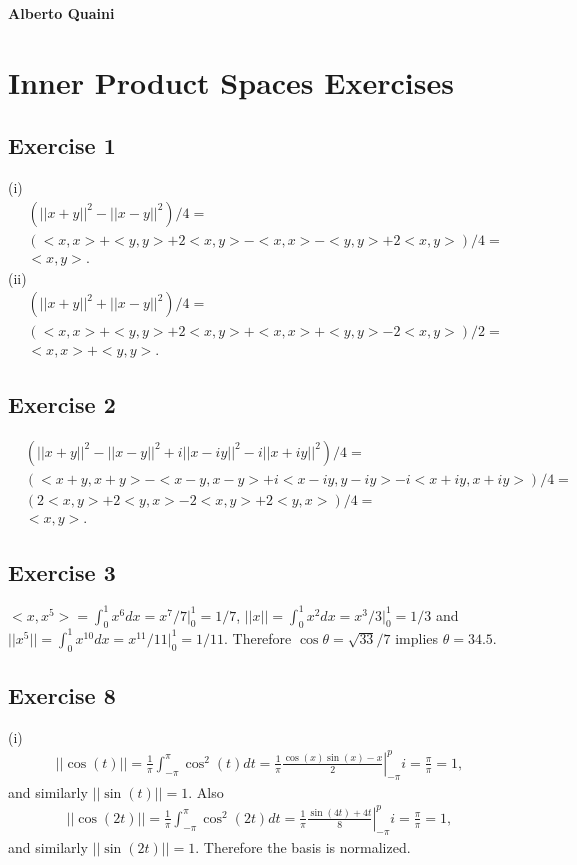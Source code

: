 \documentclass[11.5pt, letterpaper, bibtotoc,
    tablecaptionabove, figurecaptionabove]{article}
\begin{document}
\textbf{Alberto Quaini}

\section*{Inner Product Spaces Exercises}

\subsection*{Exercise 1}
(i)
\begin{align*}
    &\left( ||x+y||^2 - ||x-y||^2 \right)/4=\\
    &\left( <x,x> + <y,y> + 2<x,y> - <x,x> - <y,y> + 2<x,y>\right)/4=\\
    &<x,y>.
\end{align*}
(ii)
\begin{align*}
    &\left( ||x+y||^2 + ||x-y||^2 \right) / 4 =\\
    &\left( <x,x> + <y,y> + 2<x,y> + <x,x> + <y,y> - 2<x,y>\right) / 2 =\\
    &<x,x> + <y,y>.
\end{align*}

\subsection*{Exercise 2}
\begin{align*}
    &(||x+y||^2 - ||x-y||^2 + i||x-iy||^2 - i||x+iy||^2) / 4 =\\
    &(<x+y,x+y> - <x-y,x-y> + i<x-iy,y-iy> - i<x+iy,x+iy>) / 4 =\\ 
    &(2<x,y> + 2<y,x> -2<x,y> +2<y,x>) / 4=\\
    &<x,y>.
\end{align*}

\subsection*{Exercise 3}
$<x,x^5> = \int_0^1x^6dx=x^7/7|_0^1=1/7$,
$||x|| = \int_0^1x^2dx=x^3/3|_0^1=1/3$ and
$||x^5|| = \int_0^1x^10dx=x^11/11|_0^1=1/11$.
Therefore $\cos\theta=\sqrt{33}/7$ implies $\theta=34.5$.

\subsection*{Exercise 8}
(i)
\begin{align*}
    ||\cos(t)||=\frac{1}{\pi}\int_{-\pi}^\pi\cos^2(t)dt=
    \frac{1}{\pi}\left.\frac{\cos(x)\sin(x)-x}{2}\right\lvert_{-\pi}^pi=\frac{\pi}{\pi}=1,
\end{align*}
and similarly $||\sin(t)||=1$.
Also
\begin{align*}
    ||\cos(2t)||=\frac{1}{\pi}\int_{-\pi}^\pi\cos^2(2t)dt=
    \frac{1}{\pi}\left.\frac{\sin(4t)+4t}{8}\right\lvert_{-\pi}^pi=\frac{\pi}{\pi}=1,
\end{align*}
and similarly $||\sin(2t)||=1$.
Therefore the basis is normalized.
\end{document}
